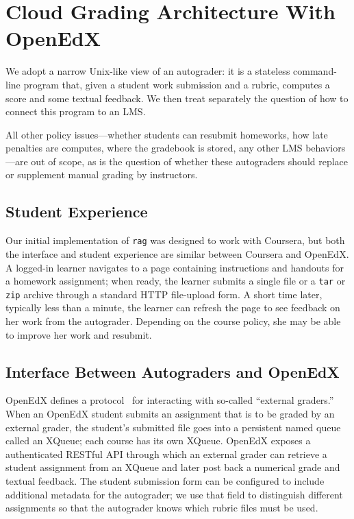 \section{Cloud Grading Architecture With OpenEdX}
\label{sec:arch}

We adopt a narrow Unix-like view of an autograder: it is a
stateless command-line program that, given a student work submission and
a rubric, computes a score and some textual feedback.  We then treat
separately the question of how to connect this program to an LMS.

All other policy issues---whether students can resubmit homeworks, how
late penalties are computes, where the gradebook is stored, any other
LMS behaviors---are out of scope, as is the question of whether these
autograders should replace or supplement manual grading by instructors.

\subsection{Student Experience}

Our initial implementation of \texttt{rag} was designed to work with
Coursera, but both the interface and student experience are similar
between Coursera and OpenEdX.  A logged-in learner navigates to a page
containing instructions and handouts for a homework assignment;
when ready, the learner submits a single file or a
\texttt{tar} or \texttt{zip} archive through a standard HTTP
file-upload form.  A short time later, typically less than a minute, the
learner can refresh the page to see feedback on her work from the
autograder.  Depending on the course policy, she may be able to improve
her work and resubmit.

\subsection{Interface Between Autograders and OpenEdX}


OpenEdX defines a 
protocol~
for interacting with so-called ``external
graders.''  When an OpenEdX student submits an assignment that is
to be graded by an external grader, the student's submitted file goes
into a persistent named queue called an XQueue; each course has its own
XQueue.  OpenEdX exposes a 
authenticated RESTful API  through which an
external grader can retrieve a student assignment from an XQueue and
later post back a numerical grade and textual feedback.  
The student submission form can be configured to include additional
metadata for the autograder; we use that field to distinguish different
assignments so that the autograder knows which rubric files must be used.


